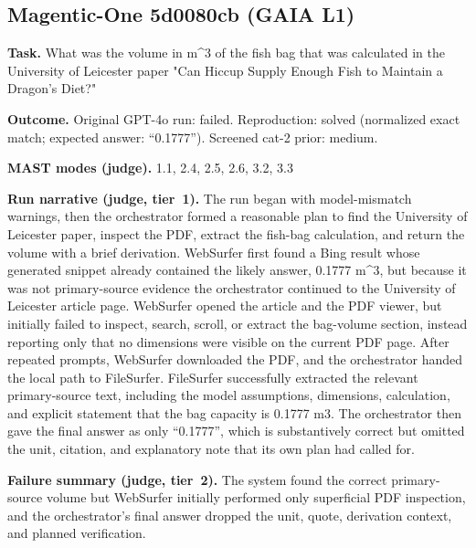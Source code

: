 \subsection*{Magentic-One 5d0080cb (GAIA L1)}
\textbf{Task.} What was the volume in m\textasciicircum{}3 of the fish bag that was calculated in the University of Leicester paper "Can Hiccup Supply Enough Fish to Maintain a Dragon's Diet?"

\textbf{Outcome.} Original GPT-4o run: failed. Reproduction: solved (normalized exact match; expected answer: ``0.1777''). Screened cat-2 prior: medium.

\textbf{MAST modes (judge).} 1.1, 2.4, 2.5, 2.6, 3.2, 3.3

\textbf{Run narrative (judge, tier~1).} The run began with model-mismatch warnings, then the orchestrator formed a reasonable plan to find the University of Leicester paper, inspect the PDF, extract the fish-bag calculation, and return the volume with a brief derivation. WebSurfer first found a Bing result whose generated snippet already contained the likely answer, 0.1777 m\textasciicircum{}3, but because it was not primary-source evidence the orchestrator continued to the University of Leicester article page. WebSurfer opened the article and the PDF viewer, but initially failed to inspect, search, scroll, or extract the bag-volume section, instead reporting only that no dimensions were visible on the current PDF page. After repeated prompts, WebSurfer downloaded the PDF, and the orchestrator handed the local path to FileSurfer. FileSurfer successfully extracted the relevant primary-source text, including the model assumptions, dimensions, calculation, and explicit statement that the bag capacity is 0.1777 m3. The orchestrator then gave the final answer as only ``0.1777'', which is substantively correct but omitted the unit, citation, and explanatory note that its own plan had called for.

\textbf{Failure summary (judge, tier~2).} The system found the correct primary-source volume but WebSurfer initially performed only superficial PDF inspection, and the orchestrator's final answer dropped the unit, quote, derivation context, and planned verification.

